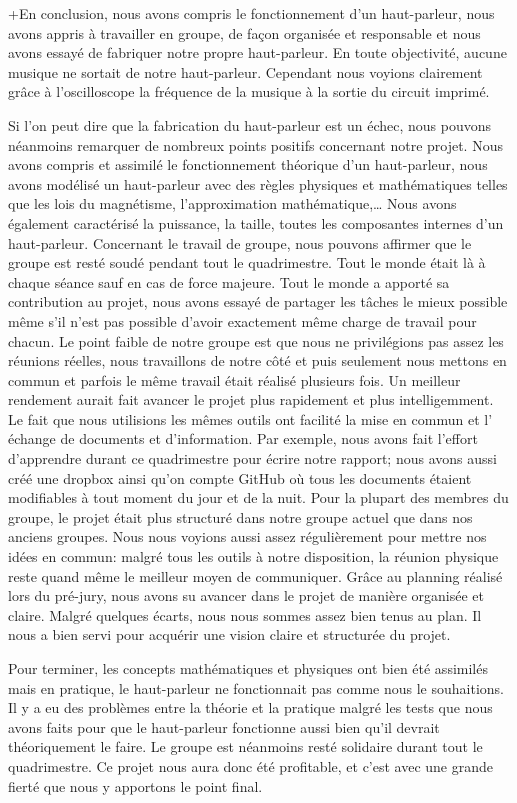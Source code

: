 

+En conclusion, nous avons compris le fonctionnement d’un haut-parleur, 
nous avons appris à travailler en groupe, de façon organisée et responsable
et nous avons essayé de fabriquer notre propre haut-parleur. 
En toute objectivité, aucune musique ne sortait de notre haut-parleur.  
Cependant nous voyions clairement grâce à l’oscilloscope la fréquence de 
la musique à la sortie du circuit imprimé.


Si l’on peut dire que la fabrication du haut-parleur est un échec, nous pouvons
néanmoins remarquer de nombreux points positifs concernant notre projet.
Nous avons compris et assimilé le fonctionnement théorique d’un haut-parleur, 
nous avons modélisé un haut-parleur avec des règles physiques et mathématiques 
telles que les lois du magnétisme, l’approximation mathématique,…  Nous avons également
caractérisé la puissance, la taille, toutes les composantes internes d’un haut-parleur. 
Concernant le travail de groupe, nous pouvons affirmer que le groupe est resté soudé
pendant tout le quadrimestre.  Tout le monde était là à chaque séance sauf en cas
de force majeure.  Tout le monde a apporté sa contribution au projet, nous avons essayé de
partager les tâches le mieux possible même s’il n’est pas possible d’avoir 
exactement même charge de travail pour chacun.  Le point faible de notre groupe est 
que nous ne privilégions pas assez les réunions réelles, nous travaillons de notre 
côté et puis seulement nous mettons en commun et parfois le même travail était 
réalisé plusieurs fois.  Un meilleur rendement aurait fait avancer le projet plus 
rapidement et plus intelligemment. 
Le fait que nous utilisions les mêmes outils ont facilité la mise en commun et l’
échange de documents et d’information. Par exemple, nous avons fait l’effort d’apprendre 
\latex{} durant ce quadrimestre pour écrire notre rapport; nous avons aussi
créé une dropbox ainsi qu’on compte GitHub où tous les documents étaient modifiables à 
tout moment du jour et de la nuit.  Pour la plupart des membres du groupe, le projet était 
plus structuré dans notre groupe actuel que dans nos anciens groupes.  Nous nous voyions aussi 
assez régulièrement pour mettre nos idées en commun: malgré tous les outils à notre 
disposition, la réunion physique reste quand même le meilleur moyen de communiquer.
Grâce au planning réalisé lors du pré-jury, nous avons su avancer dans le projet de manière
organisée et claire.  Malgré quelques écarts, nous nous sommes assez bien tenus au plan.
Il  nous a bien servi pour acquérir une vision claire et structurée du projet. 


Pour terminer, les concepts mathématiques et physiques ont bien été assimilés mais en 
pratique, le haut-parleur ne fonctionnait pas comme nous le souhaitions.  Il y a eu des
problèmes entre la théorie et la pratique malgré les tests que nous avons faits pour que 
le haut-parleur fonctionne aussi bien qu’il devrait théoriquement le faire.  Le groupe 
est néanmoins resté solidaire durant tout le quadrimestre. Ce projet nous aura donc été
profitable, et c'est avec une grande fierté que nous y apportons le point final.


